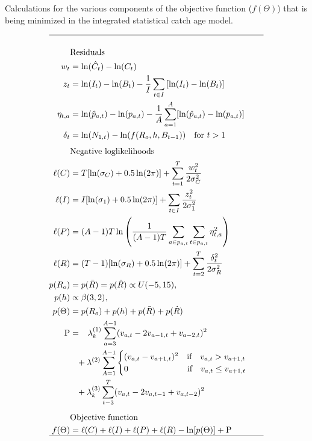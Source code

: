 \documentclass[review,letterpaper,10pt,authoryear]{elsarticle}
\newcounter{saveEq}
\def\putEq{\setcounter{saveEq}{\value{equation}}}
\def\getEq{\setcounter{equation}{\value{saveEq}}}
\def\tableEq{ %
	\putEq \setcounter{equation}{0}
	\renewcommand{\theequation}{T\arabic{table}.\arabic{equation}}
	\vspace{-5mm}
	}
\def\normalEq{ %
	\getEq
	\renewcommand{\theequation}{\arabic{section}.\arabic{equation}}}
\begin{document}
\begin{table}[!tbh]
	\tableEq
	\caption{Calculations for the various components of the objective function ($f(\Theta)$) that is being minimized in the integrated statistical catch age model.}\label{tab:likelihoods}
	\begin{align}
		\hline \nonumber\\
		&\mbox{Residuals}\nonumber\\
		w_t&= \ln(\hat{C}_t) - \ln(C_t)\label{eq:T1.1}\\
		z_t&= \ln(I_t) - \ln(B_t) - \frac{1}{I}\sum_{t\in I}\left[\ln(I_t) - \ln(B_t)\right]\label{eq:T1.2}\\
		\eta_{t,a}&= \ln(\hat{p}_{a,t}) - \ln(p_{a,t})
				 - \frac{1}{A}\sum_{a=1}^A [\ln(\hat{p}_{a,t}) - \ln(p_{a,t})]
				 \label{eq:T1.3}\\
		\delta_t &= \ln(N_{1,t}) - \ln(f(R_o,h,B_{t-1})) \quad
		\mbox{for $t > 1$}\label{eq:T1.4}\\[1ex]
		&\mbox{Negative loglikelihoods}\nonumber\\
		\ell(C)& = T [\ln(\sigma_C) + 0.5\ln(2 \pi) ] +\sum_{t=1}^T
		\frac{w_t^2}{2\sigma_C^2} \label{eq:L1.1}\\
		\ell(I)& = I[\ln(\sigma_1) + 0.5\ln(2 \pi) ] + \sum_{t \in I}
		\frac{z_t^2}{2\sigma_1^2} \label{eq:L1.2} \\
		\ell(P)& = (A-1)T \ln\left(\frac{1}{(A-1)T}\sum_{a\in p_{a,t}} 
		\sum_{t\in p_{a,t}} \eta_{t,a}^2 \right)\label{eq:L1.3} \\
		\ell(R)& = (T-1)[\ln(\sigma_R) + 0.5\ln(2 \pi) ] + \sum_{t =2}^T
		\frac{\delta_t^2}{2\sigma_R^2} \label{eq:L1.4} \\
		p(R_o)&=p(\bar{R})=p(\dot{R}) \propto U(-5,15),\nonumber\\
		p(h)   &\propto \beta(3,2),\nonumber\\
		{p}(\Theta) & = p(R_o)+ p(h) + p(\bar{R})+p(\dot{R})
			\label{eq:L1.5}\\
		\mathrm{P} & = \phantom{+} \lambda^{(1)}_k \sum_{a=3}^{A-1}(v_{a,t}-2v_{a-1,t} + v_{a-2,t})^2
		\nonumber\\
		\phantom{P} & \phantom{=}+ \lambda^{(2)}\sum_{A=1}^{A-1}
		\begin{cases}
			(v_{a,t}-v_{a+1,t})^2\quad \mbox{if}\quad v_{a,t} > v_{a+1,t}\\
			0\phantom{ (v_{a,t}-v_{a+1,t})} \quad \mbox{if} \quad v_{a,t} \leq v_{a+1,t}
		\end{cases}\nonumber\\
		\phantom{P} & \phantom{=}+ \lambda_k^{(3)} \sum_{t-3}^T
		(v_{a,t}-2v_{a,t-1} + v_{a,t-2})^2
		 \label{eq:L1.6}\\[1ex]
		&\mbox{Objective function}\nonumber\\
		f(\Theta)& = \ell(C) + \ell(I) + \ell(P) + \ell(R) -\ln[{p}(\Theta)] + \mathrm{P}\\
		\hline \nonumber
	\end{align}
	\normalEq
\end{table}
\end{document}
